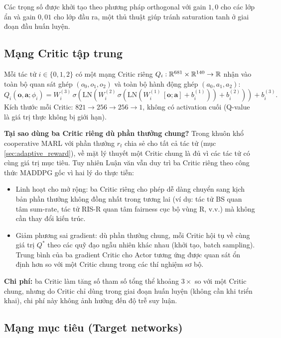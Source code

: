 Các trọng số được khởi tạo theo phương pháp orthogonal với gain
$1{,}0$ cho các lớp ẩn và gain $0{,}01$ cho lớp đầu ra, một thủ thuật
giúp tránh saturation tanh ở giai đoạn đầu huấn luyện.

\subsection{Mạng Critic tập trung}

Mỗi tác tử $i \in \{0, 1, 2\}$ có một mạng Critic riêng
$Q_i: \mathbb{R}^{681} \times \mathbb{R}^{140} \to \mathbb{R}$ nhận vào toàn bộ quan sát ghép
$(o_0, o_1, o_2)$ và toàn bộ hành động ghép $(a_0, a_1, a_2)$:
\begin{equation}
Q_i(\mathbf{o}, \mathbf{a}; \phi_i) =
W^{(3)}_i\,\sigma(\mathrm{LN}(W^{(2)}_i\,
\sigma(\mathrm{LN}(W^{(1)}_i\,[\mathbf{o}; \mathbf{a}] + b^{(1)}_i)) + b^{(2)}_i))
+ b^{(3)}_i.
\label{eq:critic_nn}
\end{equation}
Kích thước mỗi Critic: $821 \to 256 \to 256 \to 1$, không có activation
cuối (Q-value là giá trị thực không bị giới hạn).

\textbf{Tại sao dùng ba Critic riêng dù phần thưởng chung?} Trong khuôn
khổ cooperative MARL với phần thưởng $r_t$ chia sẻ cho tất cả tác tử
(mục \ref{sec:adaptive_reward}), về mặt lý thuyết một Critic chung là đủ
vì các tác tử có cùng giá trị mục tiêu. Tuy nhiên Luận văn vẫn duy trì
ba Critic riêng theo công thức MADDPG gốc \cite{lowe2017multi}
vì hai lý do thực tiễn:
\begin{itemize}[leftmargin=*]
\item Linh hoạt cho mở rộng: ba Critic riêng cho phép dễ dàng
chuyển sang kịch bản phần thưởng không đồng nhất trong tương lai
(ví dụ: tác tử BS quan tâm sum-rate, tác tử RIS-R quan tâm fairness cục
bộ vùng R, v.v.) mà không cần thay đổi kiến trúc.
\item Giảm phương sai gradient: dù phần thưởng chung, mỗi Critic
hội tụ về cùng giá trị $Q^*$ theo các quỹ đạo ngẫu nhiên khác nhau
(khởi tạo, batch sampling). Trung bình của ba gradient Critic cho Actor
tương ứng được quan sát ổn định hơn so với một Critic chung trong các
thí nghiệm sơ bộ.
\end{itemize}
\textbf{Chi phí:} ba Critic làm tăng số tham số tổng thể khoảng $3\times$
so với một Critic chung, nhưng do Critic chỉ dùng trong giai đoạn huấn
luyện (không cần khi triển khai), chi phí này không ảnh hưởng đến độ
trễ suy luận.

\subsection{Mạng mục tiêu (Target networks)}


